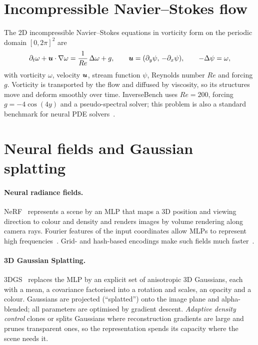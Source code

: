 \section{Incompressible Navier--Stokes flow}
The 2D incompressible Navier--Stokes equations in vorticity form on the periodic domain $[0,2\pi]^2$ are
\begin{equation}
  \partial_t \omega + \bm{u}\cdot\nabla\omega = \frac{1}{Re}\,\Delta\omega + g, \qquad
  \bm{u} = (\partial_y\psi,\,-\partial_x\psi), \qquad -\Delta\psi = \omega,
\end{equation}
with vorticity $\omega$, velocity $\bm{u}$, stream function $\psi$, Reynolds number $Re$ and forcing $g$. Vorticity
is transported by the flow and diffused by viscosity, so its structures move and deform smoothly over time. InverseBench
uses $Re=200$, forcing $g=-4\cos(4y)$ and a pseudo-spectral solver; this problem is also a standard benchmark for
neural PDE solvers~\citep{li2021fno}.

\section{Neural fields and Gaussian splatting}
\paragraph{Neural radiance fields.} NeRF~\citep{mildenhall2020nerf} represents a scene by an MLP that maps a 3D
position and viewing direction to colour and density and renders images by volume rendering along camera rays. Fourier
features of the input coordinates allow MLPs to represent high frequencies~\citep{tancik2020fourier}. Grid- and
hash-based encodings make such fields much faster~\citep{mueller2022instantngp}.

\paragraph{3D Gaussian Splatting.} 3DGS~\citep{kerbl20233dgs} replaces the MLP by an explicit set of anisotropic 3D
Gaussians, each with a mean, a covariance factorised into a rotation and scales, an opacity and a colour. Gaussians are
projected (``splatted'') onto the image plane and alpha-blended; all parameters are optimised by gradient descent.
\emph{Adaptive density control} clones or splits Gaussians where reconstruction gradients are large and prunes
transparent ones, so the representation spends its capacity where the scene needs it.

